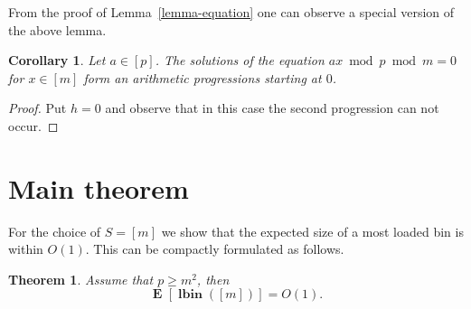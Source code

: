 \documentclass{article}
\newcommand{\vlbin}[1]{\operatorname{\mathbf{lbin}}({#1})}
\newcommand{\expects}[2]{\operatorname{\mathbf{E}}_{{#1}}\left[{#2}\right]}
\newcommand{\expect}[1]{\expects{}{#1}}
\newtheorem{theorem}{Theorem}
\newtheorem{corollary}{Corollary}
\begin{document}
From the proof of Lemma~\ref{lemma-equation} one can observe a special version of the above lemma.
\begin{corollary}
Let $a \in [p]$. The solutions of the equation $ax \bmod p \bmod m = 0$ for $x \in [m]$ form an arithmetic progressions starting at $0$.
\end{corollary}
\begin{proof}
Put $h = 0$ and observe that in this case the second progression can not occur.
\end{proof}

\section{Main theorem}

For the choice of $S = [m]$ we show that the expected size of a most loaded bin is within $O(1)$. 
This can be compactly formulated as follows.
\begin{theorem}
\label{thm:interval-constant}
Assume that $p \geq m^2$, then
\[
\expect{\vlbin{[m]}} = O(1).
\]
\end{theorem}
\end{document}
